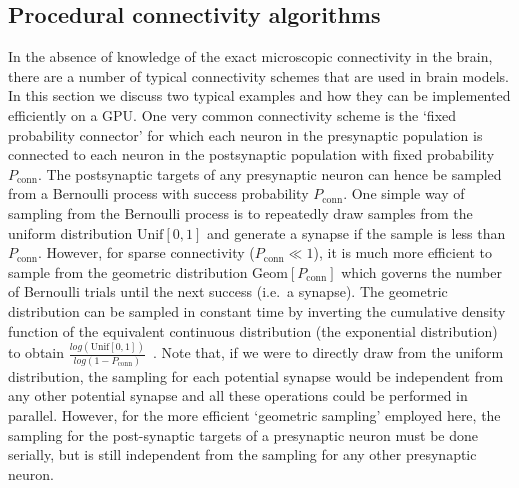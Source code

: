 \documentclass[9pt,a4paper]{amsart}
\begin{document}
\subsection{Procedural connectivity algorithms}
\label{sec:methods/procedural_connectivity}
In the absence of knowledge of the exact microscopic connectivity in the brain, there are a number of typical connectivity schemes that are used in brain models.
In this section we discuss two typical examples and how they can be implemented efficiently on a GPU.
One very common connectivity scheme is the `fixed probability connector' for which each neuron in the presynaptic population is connected to each neuron in the postsynaptic population with fixed probability $P_{\text{conn}}$.
The postsynaptic targets of any presynaptic neuron can hence be sampled from a Bernoulli process with success probability $P_{\text{conn}}$.
One simple way of sampling from the Bernoulli process is to repeatedly draw samples from the uniform distribution $\text{Unif}[0, 1]$ and generate a synapse if the sample is less than $P_{\text{conn}}$.
However, for sparse connectivity ($P_{\text{conn}} \ll 1$), it is much more efficient to sample from the geometric distribution $\text{Geom}[P_{\text{conn}}]$ which governs the number of Bernoulli trials until the next success (i.e.~a synapse).
The geometric distribution can be sampled in constant time by inverting the cumulative density function of the equivalent continuous distribution (the exponential distribution) to obtain $\frac{log(\text{Unif}[0, 1])}{log(1 - P_{\text{conn}})}$~\citep{Devroye2013}.
Note that, if we were to directly draw from the uniform distribution, the sampling for each potential synapse would be independent from any other potential synapse and all these operations could be performed in parallel.
However, for the more efficient `geometric sampling' employed here, the sampling for the post-synaptic targets of a presynaptic neuron must be done serially, but is still independent from the sampling for any other presynaptic neuron.
\end{document}

